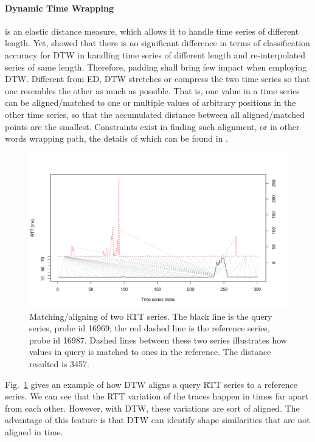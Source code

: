\paragraph*{Dynamic Time Wrapping} is an elastic distance measure, which allows it to handle time series of different length. Yet, \cite{Ratanamahatana2005} showed that there is no significant difference in terms of classification accuracy for \ac{DTW} in handling time series of different length and re-interpolated series of same length. 
Therefore, padding shall bring few impact when employing \ac{DTW}.
Different from ED, \ac{DTW} stretches or compress the two time series so that one resembles the other as much as possible. That is, one value in a time series can be aligned/matched to one or multiple values of arbitrary positions in the other time series, so that the accumulated distance between all aligned/matched points are the smallest. Constraints exist in finding such alignment, or in other words wrapping path, the details of which can be found in \cite{Sakoe1978, Keogh2005, Giorgino2009}.

\begin{figure}[!htb]
\centering
\includegraphics[width=.8\textwidth]{gfx/chap3/dtw_ex.pdf}
\caption{Matching/aligning of two RTT series. The black line is the query series, probe id 16969; the red dashed line is the reference series, probe id 16987. Dashed lines between these two series illustrates how values in query is matched to ones in the reference. The distance resulted is 3457.}
\label{fig:dtw_ex}
\end{figure}

Fig.~\ref{fig:dtw_ex} gives an example of how \ac{DTW} aligns a query RTT series to a reference series. We can see that the RTT variation of the traces happen in times far apart from each other. However, with \ac{DTW}, these variations are sort of aligned. The advantage of this feature is that \ac{DTW} can identify shape similarities that are not aligned in time.

